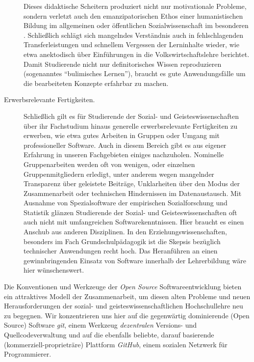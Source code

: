 \documentclass[11pt,a4paper,oneside]{article}
\begin{document}
\begin{description}

		Dieses didaktische Scheitern produziert nicht nur motivationale Probleme, sondern verletzt auch den emanzipatorischen Ethos einer humanistischen Bildung im allgemeinen %
		oder öffentlichen Sozialwissenschaft im besonderen \cite{gans1989public-sociology}.
		Schließlich schlägt sich mangelndes Verständnis auch in fehlschlagenden Transferleistungen und schnellem Vergessen der Lerninhalte wieder, wie etwa \cite{Frank2007a} anektodisch über Einführungen in die Volkswirtschaftslehre berichtet.
		Damit Studierende nicht nur definitorisches Wissen reproduzieren (sogenanntes ``bulimisches Lernen''), braucht es gute Anwendungsfälle um die bearbeiteten Konzepte erfahrbar zu machen.

	\item[Erwerbsrelevante Fertigkeiten.]
		Schließlich gilt es für Studierende der Sozial- und Geisteswissenschaften über ihr Fachstudium hinaus generelle erwerbsrelevante Fertigkeiten zu erwerben, wie etwa gutes Arbeiten in Gruppen oder Umgang mit professioneller Software.
		Auch in diesem Bereich gibt es aus eigener Erfahrung in unseren Fachgebieten einiges nachzuholen.
		Nominelle Gruppenarbeiten werden oft von wenigen, oder einzelnen Gruppenmitgliedern erledigt, unter anderem wegen mangelnder Transparenz über geleistete Beiträge, Unklarheiten über den Modus der Zusammenarbeit oder technischen Hindernissen im Datenaustausch.
		Mit Ausnahme von Spezialsoftware der empirischen Sozialforschung und Statistik glänzen Studierende der Sozial- und Geisteswissenschaften oft auch nicht mit umfangreichen Softwarekenntnissen.
		Hier braucht es einen Anschub aus anderen Disziplinen.
		In den Erziehungswissenschaften, besonders im Fach Grundschulpädagogik ist die Skepsis bezüglich technischer Anwendungen recht hoch.
		Das Heranführen an einen gewinnbringenden Einsatz von Software innerhalb der Lehrerbildung wäre hier wünschenswert.
\end{description}

Die Konventionen und Werkzeuge der \emph{Open Source} Softwareentwicklung bieten ein attraktives Modell der Zusammenarbeit, um diesen alten Probleme und neuen Herausforderungen der sozial- und geisteswissenschaftlichen Hochschullehre neu zu begegnen.
Wir konzentrieren uns hier auf die gegenwärtig dominierende  (Open Source) Software \emph{git}, einem Werkzeug \emph{dezentralen} Versions- und Quellcodeverwaltung und auf die ebenfalls beliebte, darauf basierende (kommerziell-proprieträre) Plattform \emph{GitHub}, einem sozialen Netzwerk für Programmierer.
\end{document}
